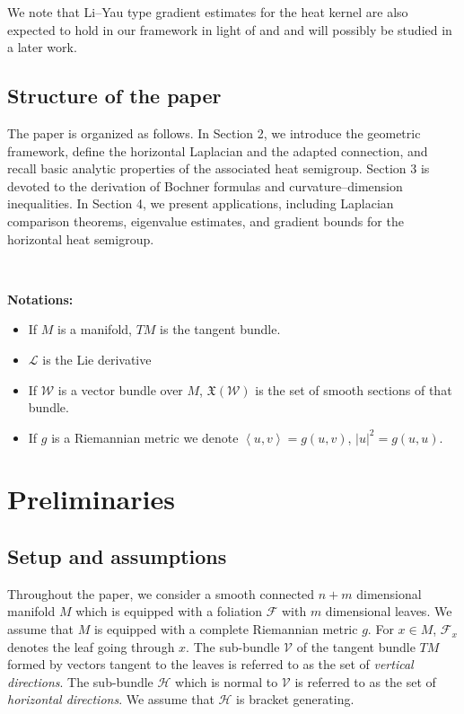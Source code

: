 \documentclass[11pt]{article}
\numberwithin{equation}{section}
\newcommand{\Ho}{\mathcal H}
\begin{document}
 We note that Li–Yau type gradient estimates for the heat kernel are also  expected to hold in our framework in light of \cite{CaoYAu,Ivanov} and \cite{Dong2} and will possibly be studied in a later work.


\subsection{Structure of the paper}
The paper is organized as follows.
In Section 2, we introduce the geometric framework, define the horizontal Laplacian and the adapted connection, and recall basic analytic properties of the associated heat semigroup.
Section 3 is devoted to the derivation of Bochner formulas and curvature–dimension inequalities.
In Section 4, we present applications, including Laplacian comparison theorems, eigenvalue estimates, and gradient bounds for the horizontal heat semigroup.

 \

\textbf{Notations:}

\begin{itemize}
\item If $M$ is a manifold, $TM$ is the tangent bundle.
\item $\mathcal{L}$ is the Lie derivative
 \item If $\mathcal{W}$ is a vector bundle over $M$, $\mathfrak{X}(\mathcal{W})$ is the set of smooth sections of that bundle.
 \item If $g$ is a Riemannian metric we denote $\left\langle u, v \right\rangle=g(u,v)$, $|u|^2=g(u,u)$.
\end{itemize}

	\section{Preliminaries}
	\subsection{Setup and assumptions}
	
	
	Throughout the paper, we consider a smooth connected $n+m$ dimensional manifold $M$ which is equipped with a foliation $\mathcal{F}$ with $m$ dimensional leaves.  We  assume that $M$ is equipped with a complete Riemannian metric $g$. For $x \in M$, $\mathcal{F}_x$ denotes the leaf going through $x$. The sub-bundle $\mathcal{V}$ of the tangent bundle $TM$ formed by vectors tangent to the leaves is referred  to as the set of \emph{vertical directions}. The sub-bundle $\mathcal{H}$ which is normal to $\mathcal{V}$ is referred to as the set of \emph{horizontal directions}. We assume that $\Ho$ is bracket generating.
    
\end{document}
